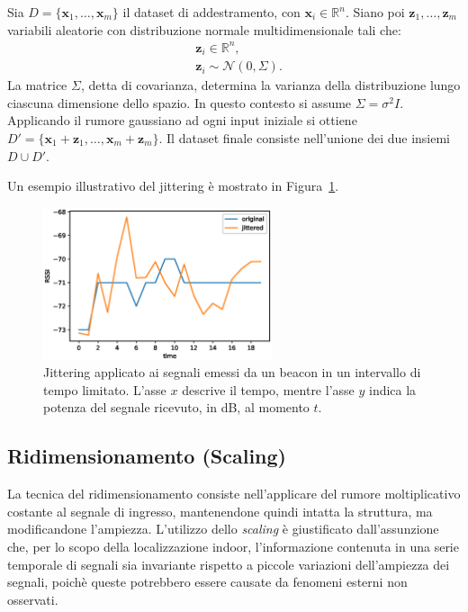 Sia \(D = \{\bm x_1, \dotsc, \bm x_m\}\) il dataset di addestramento, con 
\(\bm x_i \in \mathbb{R}^n \). Siano poi \(\bm z_1,
  \dotsc, \bm z_m \) variabili aleatorie con distribuzione normale
multidimensionale tali che: 
\begin{align*}
& \bm z_i \in \mathbb{R}^n, \\ 
& \bm z_i \sim \mathcal{N}(0, \Sigma).
\end{align*}
La matrice \(\Sigma\), detta di covarianza, determina la varianza della
distribuzione lungo ciascuna dimensione dello spazio. In questo contesto si
assume \(\Sigma=\sigma^2I\). Applicando il rumore gaussiano ad ogni input
iniziale si ottiene \(D' = \{\bm x_1 + \bm z_1, \dotsc, \bm x_m + \bm z_m\}\).
Il dataset finale consiste nell'unione dei due insiemi \( D \cup D'\).

Un esempio illustrativo del jittering è mostrato in Figura~\ref{fig:jitter}.
\begin{figure}[htp]
  \centering\includegraphics[width=0.6\textwidth]{./img/jittering.eps}
  \caption{Jittering applicato ai segnali emessi da un beacon in un intervallo
    di tempo limitato. L'asse \(x\) descrive il tempo, mentre l'asse \(y\)
    indica la potenza del segnale ricevuto, in dB, al momento \(t\).}%
  \label{fig:jitter}%
\end{figure}

\subsection{Ridimensionamento (Scaling)}
La tecnica del ridimensionamento consiste nell'applicare del rumore
moltiplicativo costante al segnale di ingresso, mantenendone quindi intatta la
struttura, ma modificandone l'ampiezza. L'utilizzo dello \emph{scaling} è
giustificato dall'assunzione che, per lo scopo della localizzazione indoor,
l'informazione contenuta in una serie temporale di segnali sia invariante
rispetto a piccole variazioni dell'ampiezza dei segnali, poichè queste
potrebbero essere causate da fenomeni esterni non osservati.

